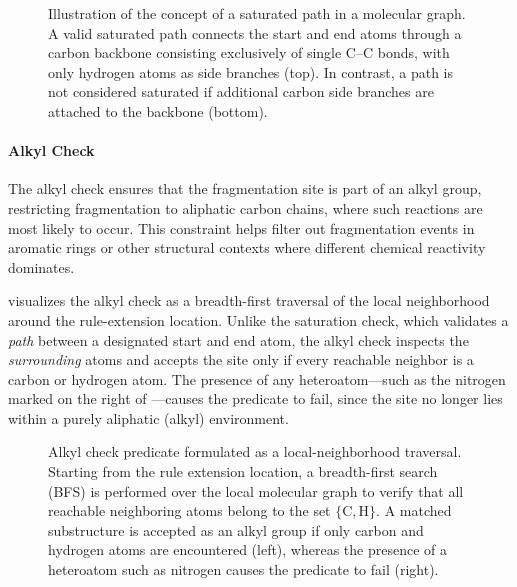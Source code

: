 \begin{figure}[H]
    \centering
    
    \caption[Saturation check predicate as constrained path traversal]{
        Illustration of the concept of a saturated path in a molecular graph.
        A valid saturated path connects the start and end atoms through a carbon backbone consisting exclusively of single C--C bonds, with only hydrogen atoms as side branches (top).
        In contrast, a path is not considered saturated if additional carbon side branches are attached to the backbone (bottom).
    }
    \label{fig:saturation-check}
\end{figure}

\paragraph{Alkyl Check}
The alkyl check ensures that the fragmentation site is part of an alkyl group, restricting fragmentation to aliphatic carbon chains, where such reactions are most likely to occur.
This constraint helps filter out fragmentation events in aromatic rings or other structural contexts where different chemical reactivity dominates.

 visualizes the alkyl check as a breadth-first traversal of the local neighborhood around the rule-extension location.
Unlike the saturation check, which validates a \emph{path} between a designated start and end atom, the alkyl check inspects the \emph{surrounding} atoms and accepts the site only if every reachable neighbor is a carbon or hydrogen atom.
The presence of any heteroatom---such as the nitrogen marked on the right of ---causes the predicate to fail, since the site no longer lies within a purely aliphatic (alkyl) environment.

\begin{figure}[H]
    \centering
    
    \caption[Alkyl check predicate]{
        Alkyl check predicate formulated as a local-neighborhood traversal.
        Starting from the rule extension location, a breadth-first search (BFS) is performed over the local molecular graph to verify that all reachable neighboring atoms belong to the set \(\{ \mathrm{C}, \mathrm{H} \}\).
        A matched substructure is accepted as an alkyl group if only carbon and hydrogen atoms are encountered (left),   whereas the presence of a heteroatom such as nitrogen causes the predicate to fail (right).
    }
    \label{fig:alkyl-check}
\end{figure}

